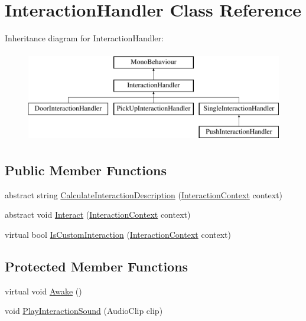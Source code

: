 \hypertarget{class_interaction_handler}{}\section{Interaction\+Handler Class Reference}
\label{class_interaction_handler}
Inheritance diagram for Interaction\+Handler\+:\begin{figure}[H]
\begin{center}
\leavevmode
\includegraphics[height=4.000000cm]{class_interaction_handler}
\end{center}
\end{figure}
\subsection*{Public Member Functions}
\begin{DoxyCompactItemize}
\item 
abstract string \mbox{\hyperlink{class_interaction_handler_acdd154cb8b276e122915412b3b7274d3}{Calculate\+Interaction\+Description}} (\mbox{\hyperlink{class_interaction_context}{Interaction\+Context}} context)
\item 
abstract void \mbox{\hyperlink{class_interaction_handler_ae240fb919621a4e6d5e3dc6130c809d0}{Interact}} (\mbox{\hyperlink{class_interaction_context}{Interaction\+Context}} context)
\item 
virtual bool \mbox{\hyperlink{class_interaction_handler_aa6e40ea3f53f5f2a900fd25cf84c8b7f}{Is\+Custom\+Interaction}} (\mbox{\hyperlink{class_interaction_context}{Interaction\+Context}} context)
\end{DoxyCompactItemize}
\subsection*{Protected Member Functions}
\begin{DoxyCompactItemize}
\item 
virtual void \mbox{\hyperlink{class_interaction_handler_adbbb312d562d3060de296f6da5c97631}{Awake}} ()
\item 
void \mbox{\hyperlink{class_interaction_handler_aecb9eb68b09058f64831e337022868d5}{Play\+Interaction\+Sound}} (Audio\+Clip clip)
\end{DoxyCompactItemize}



